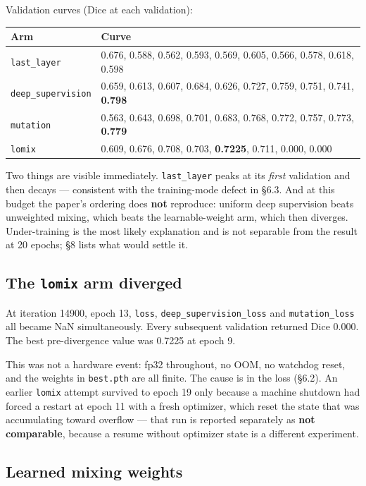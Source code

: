 \documentclass[11pt,a4paper]{article}
\newcommand{\code}[1]{\texttt{\small #1}}
\begin{document}
Validation curves (Dice at each validation):

\begin{center}
\begin{tabular}{@{}lp{11.5cm}@{}}
\toprule
\textbf{Arm} & \textbf{Curve} \\
\midrule
\code{last\_layer} & 0.676, 0.588, 0.562, 0.593, 0.569, 0.605, 0.566, 0.578, 0.618, 0.598 \\
\code{deep\_supervision} & 0.659, 0.613, 0.607, 0.684, 0.626, 0.727, 0.759, 0.751, 0.741, \textbf{0.798} \\
\code{mutation} & 0.563, 0.643, 0.698, 0.701, 0.683, 0.768, 0.772, 0.757, 0.773, \textbf{0.779} \\
\code{lomix} & 0.609, 0.676, 0.708, 0.703, \textbf{0.7225}, 0.711, 0.000, 0.000 \\
\bottomrule
\end{tabular}
\end{center}

Two things are visible immediately. \code{last\_layer} peaks at its \emph{first}
validation and then decays --- consistent with the training-mode defect in
\S6.3. And at this budget the paper's ordering does \textbf{not} reproduce:
uniform deep supervision beats unweighted mixing, which beats the
learnable-weight arm, which then diverges. Under-training is the most likely
explanation and is not separable from the result at 20 epochs; \S8 lists what
would settle it.

\subsection{The \code{lomix} arm diverged}

At iteration 14900, epoch 13, \code{loss}, \code{deep\_supervision\_loss} and
\code{mutation\_loss} all became NaN simultaneously. Every subsequent validation
returned Dice 0.000. The best pre-divergence value was 0.7225 at epoch 9.

This was not a hardware event: fp32 throughout, no OOM, no watchdog reset, and
the weights in \code{best.pth} are all finite. The cause is in the loss
(\S6.2). An earlier \code{lomix} attempt survived to epoch 19 only because a
machine shutdown had forced a restart at epoch 11 with a fresh optimizer, which
reset the state that was accumulating toward overflow --- that run is reported
separately as \textbf{not comparable}, because a resume without optimizer state
is a different experiment.

\subsection{Learned mixing weights}
\end{document}
